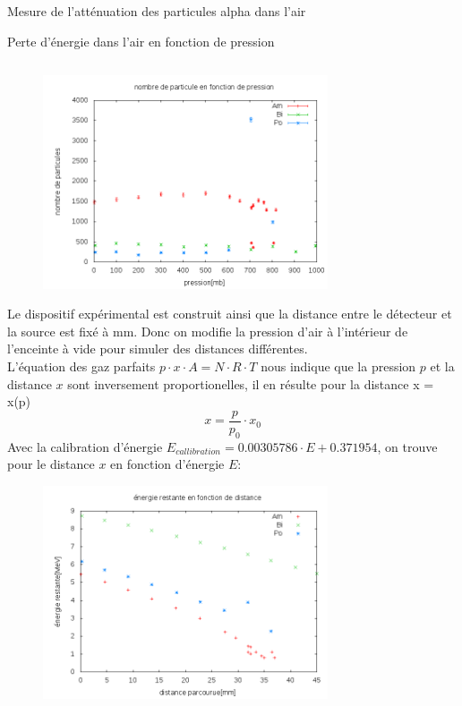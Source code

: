 \documentclass[a4paper,11pt]{scrartcl}
\begin{document}
\begin{section}{Mesure de l'atténuation des particules alpha dans l'air}
\begin{subsection}{Perte d'énergie dans l'air en fonction de pression}
\begin{table}[H]
\begin{center}
\begin{tabular}{c|c|c|c|c|c|c|c}
     \end{tabular}
    \end{center}
   \end{table}
   \begin{figure}[H]
    \begin{center}
     \includegraphics[width=0.75\textwidth]{Bilder/fonction_pression.png}
    \end{center}
   \end{figure}
   Le dispositif expérimental est construit ainsi que la distance entre le détecteur et la source est fixé à \unit[45]{mm}. Donc on modifie la pression d'air à l'intérieur de l'enceinte à vide pour simuler des distances différentes.\\
   L'équation des gaz parfaits $p \cdot x \cdot A =N \cdot R \cdot T$ nous indique que la pression $p$ et la distance $x$ sont inversement proportionelles, il en résulte pour la distance x = x(p) 
   \begin{equation*}
    x=\frac{p}{p_0}\cdot x_0
   \end{equation*}
\newpage
   Avec la calibration d'énergie $E_{callibration}= 0.00305786  \cdot E +0.371954 $, on trouve pour le distance $x$ en fonction d'énergie $E$:
   \begin{figure}[h]
    \begin{center}
     \includegraphics[width=0.75\textwidth]{Bilder/energie_restante.png}

\end{center}
\end{figure}
\end{subsection}
\end{section}
\end{document}
